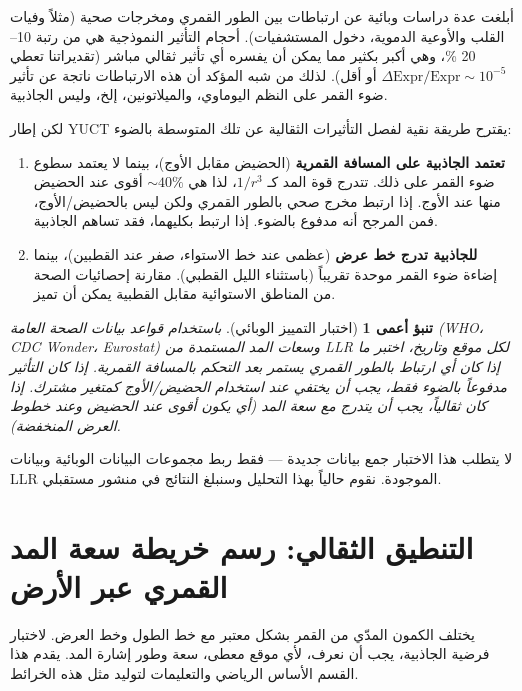 \documentclass[11pt,a4paper]{article}
\newtheorem{prediction}[theorem]{تنبؤ أعمى}
\theoremstyle{remark}
\begin{document}
	أبلغت عدة دراسات وبائية عن ارتباطات بين الطور القمري ومخرجات صحية (مثلاً وفيات القلب والأوعية الدموية، دخول المستشفيات). أحجام التأثير النموذجية هي من رتبة 10–20 \%، وهي أكبر بكثير مما يمكن أن يفسره أي تأثير ثقالي مباشر (تقديراتنا تعطي \(\Delta\text{Expr}/\text{Expr} \sim 10^{-5}\) أو أقل). لذلك من شبه المؤكد أن هذه الارتباطات ناتجة عن تأثير ضوء القمر على النظم اليوماوي، والميلاتونين، إلخ، وليس الجاذبية.
	
	لكن إطار YUCT يقترح طريقة نقية لفصل التأثيرات الثقالية عن تلك المتوسطة بالضوء:
	
	\begin{enumerate}
		\item \textbf{تعتمد الجاذبية على المسافة القمرية} (الحضيض مقابل الأوج)، بينما لا يعتمد سطوع ضوء القمر على ذلك. تتدرج قوة المد كـ \(1/r^3\)، لذا هي \(\sim 40\%\) أقوى عند الحضيض منها عند الأوج. إذا ارتبط مخرج صحي بالطور القمري ولكن ليس بالحضيض/الأوج، فمن المرجح أنه مدفوع بالضوء. إذا ارتبط بكليهما، فقد تساهم الجاذبية.
		\item \textbf{للجاذبية تدرج خط عرض} (عظمى عند خط الاستواء، صفر عند القطبين)، بينما إضاءة ضوء القمر موحدة تقريباً (باستثناء الليل القطبي). مقارنة إحصائيات الصحة من المناطق الاستوائية مقابل القطبية يمكن أن تميز.
	\end{enumerate}
	
	\begin{prediction}[اختبار التمييز الوبائي]
		باستخدام قواعد بيانات الصحة العامة (WHO، CDC Wonder، Eurostat) وسعات المد المستمدة من LLR لكل موقع وتاريخ، اختبر ما إذا كان أي ارتباط بالطور القمري يستمر بعد التحكم بالمسافة القمرية. إذا كان التأثير مدفوعاً بالضوء فقط، يجب أن يختفي عند استخدام الحضيض/الأوج كمتغير مشترك. إذا كان ثقالياً، يجب أن يتدرج مع سعة المد (أي يكون أقوى عند الحضيض وعند خطوط العرض المنخفضة).
	\end{prediction}
	
	لا يتطلب هذا الاختبار جمع بيانات جديدة — فقط ربط مجموعات البيانات الوبائية وبيانات LLR الموجودة. نقوم حالياً بهذا التحليل وسنبلغ النتائج في منشور مستقبلي.
	
	\section{التنطيق الثقالي: رسم خريطة سعة المد القمري عبر الأرض}
	\label{sec:map}
	
	يختلف الكمون المدّي من القمر بشكل معتبر مع خط الطول وخط العرض. لاختبار فرضية الجاذبية، يجب أن نعرف، لأي موقع معطى، سعة وطور إشارة المد. يقدم هذا القسم الأساس الرياضي والتعليمات لتوليد مثل هذه الخرائط.
	
\end{document}
